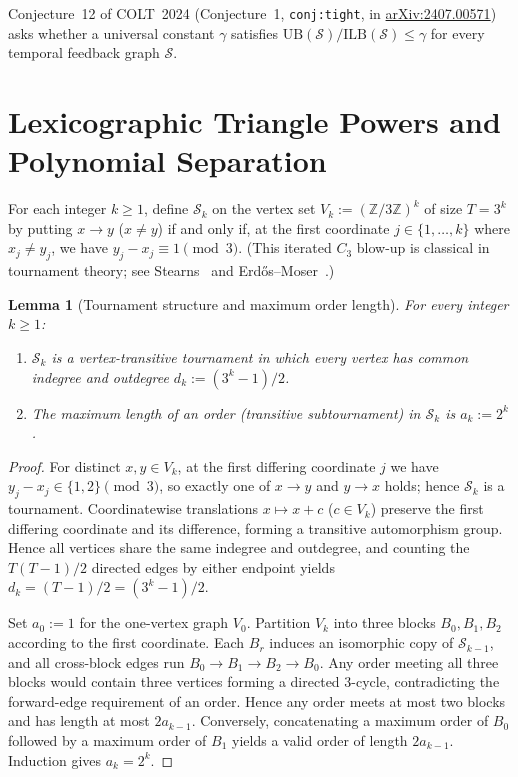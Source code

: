 \documentclass[11pt]{article}
\theoremstyle{plain}
\newtheorem{lemma}[theorem]{Lemma}
\theoremstyle{definition}
\theoremstyle{remark}
\newcommand{\UB}{\mathrm{UB}}
\newcommand{\ILB}{\mathrm{ILB}}
\begin{document}
Conjecture~12 of COLT~2024 (Conjecture~1, \texttt{conj:tight}, in \href{https://arxiv.org/abs/2407.00571}{arXiv:2407.00571}) asks whether a universal constant $\gamma$ satisfies $\UB(\mathcal{S}) / \ILB(\mathcal{S}) \le \gamma$ for every temporal feedback graph $\mathcal{S}$.

\section{Lexicographic Triangle Powers and Polynomial Separation}

For each integer $k \ge 1$, define $\mathcal{S}_k$ on the vertex set $V_k := (\mathbb{Z}/3\mathbb{Z})^k$ of size $T = 3^k$ by putting $x \to y$ ($x \neq y$) if and only if, at the first coordinate $j \in \{1, \dots, k\}$ where $x_j \neq y_j$, we have $y_j - x_j \equiv 1 \pmod 3$.
(This iterated $C_3$ blow-up is classical in tournament theory; see Stearns~\cite{Stearns1959} and Erd\H{o}s--Moser~\cite{ErdosMoser1964}.)

\begin{lemma}[Tournament structure and maximum order length]\label{lem:tri}
For every integer $k \ge 1$:
\begin{enumerate}[label=\textup{(\arabic*)}]
\item $\mathcal{S}_k$ is a vertex-transitive tournament in which every vertex has common indegree and outdegree $d_k := (3^k - 1)/2$.
\item The maximum length of an order (transitive subtournament) in $\mathcal{S}_k$ is $a_k := 2^k$.
\end{enumerate}
\end{lemma}

\begin{proof}
For distinct $x, y \in V_k$, at the first differing coordinate $j$ we have $y_j - x_j \in \{1, 2\} \pmod 3$, so exactly one of $x \to y$ and $y \to x$ holds; hence $\mathcal{S}_k$ is a tournament.
Coordinatewise translations $x \mapsto x + c$ ($c \in V_k$) preserve the first differing coordinate and its difference, forming a transitive automorphism group. Hence all vertices share the same indegree and outdegree, and counting the $T(T - 1)/2$ directed edges by either endpoint yields $d_k = (T - 1)/2 = (3^k - 1)/2$.

Set $a_0 := 1$ for the one-vertex graph $V_0$. Partition $V_k$ into three blocks $B_0, B_1, B_2$ according to the first coordinate. Each $B_r$ induces an isomorphic copy of $\mathcal{S}_{k-1}$, and all cross-block edges run $B_0 \to B_1 \to B_2 \to B_0$. Any order meeting all three blocks would contain three vertices forming a directed $3$-cycle, contradicting the forward-edge requirement of an order. Hence any order meets at most two blocks and has length at most $2 a_{k-1}$. Conversely, concatenating a maximum order of $B_0$ followed by a maximum order of $B_1$ yields a valid order of length $2 a_{k-1}$. Induction gives $a_k = 2^k$.
\end{proof}
\end{document}
